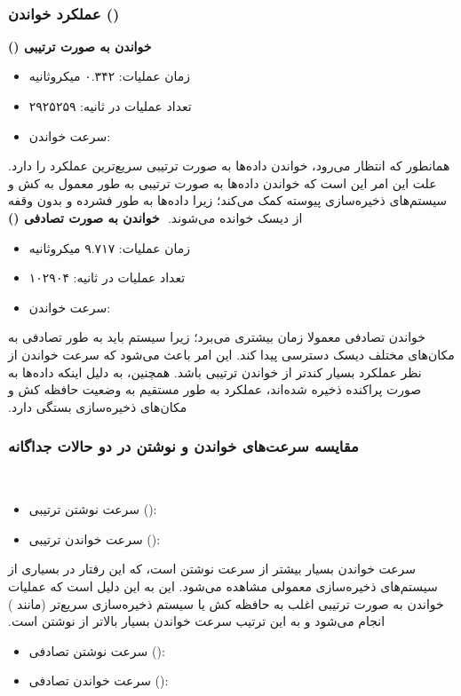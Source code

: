 ‫
‫\subsubsection*{عملکرد خواندن ()}
‫
‫\textbf{خواندن به صورت ترتیبی ()}
‫\begin{itemize}
‫    \item زمان عملیات: ۰.۳۴۲ میکروثانیه
‫    \item تعداد عملیات در ثانیه: ۲۹۲۵۲۵۹
‫    \item سرعت خواندن: 
‫\end{itemize}
‫همانطور که انتظار می‌رود، خواندن داده‌ها به صورت ترتیبی سریع‌ترین عملکرد را دارد. علت این امر این است که خواندن داده‌ها به صورت ترتیبی به طور معمول به کش و سیستم‌های ذخیره‌سازی پیوسته کمک می‌کند؛ زیرا داده‌ها به طور فشرده و بدون وقفه از دیسک خوانده می‌شوند.
‫
‫\textbf{خواندن به صورت تصادفی ()}
‫\begin{itemize}
‫    \item زمان عملیات: ۹.۷۱۷ میکروثانیه
‫    \item تعداد عملیات در ثانیه: ۱۰۲۹۰۴
‫    \item سرعت خواندن: 
‫\end{itemize}
‫خواندن تصادفی معمولا زمان بیشتری می‌برد؛ زیرا سیستم باید به طور تصادفی به مکان‌های مختلف دیسک دسترسی پیدا کند. این امر باعث می‌شود که سرعت خواندن از نظر عملکرد بسیار کندتر از خواندن ترتیبی باشد. همچنین، به دلیل اینکه داده‌ها به صورت پراکنده ذخیره شده‌اند، عملکرد به طور مستقیم به وضعیت حافظه کش و مکان‌های ذخیره‌سازی بستگی دارد.
‫
‫\subsubsection*{مقایسه سرعت‌های خواندن و نوشتن در دو حالات جداگانه}
‫\begin{itemize}
‫    \item سرعت نوشتن ترتیبی (): 
‫    \item سرعت خواندن ترتیبی (): 
‫\end{itemize}
‫سرعت خواندن بسیار بیشتر از سرعت نوشتن است، که این رفتار در بسیاری از سیستم‌های ذخیره‌سازی معمولی مشاهده می‌شود. این به این دلیل است که عملیات خواندن به صورت ترتیبی اغلب به حافظه کش یا سیستم ذخیره‌سازی سریع‌تر (مانند ) انجام می‌شود و به این ترتیب سرعت خواندن بسیار بالاتر از نوشتن است.
‫
‫\begin{itemize}
‫    \item سرعت نوشتن تصادفی (): 
‫    \item سرعت خواندن تصادفی (): 
‫\end{itemize}
